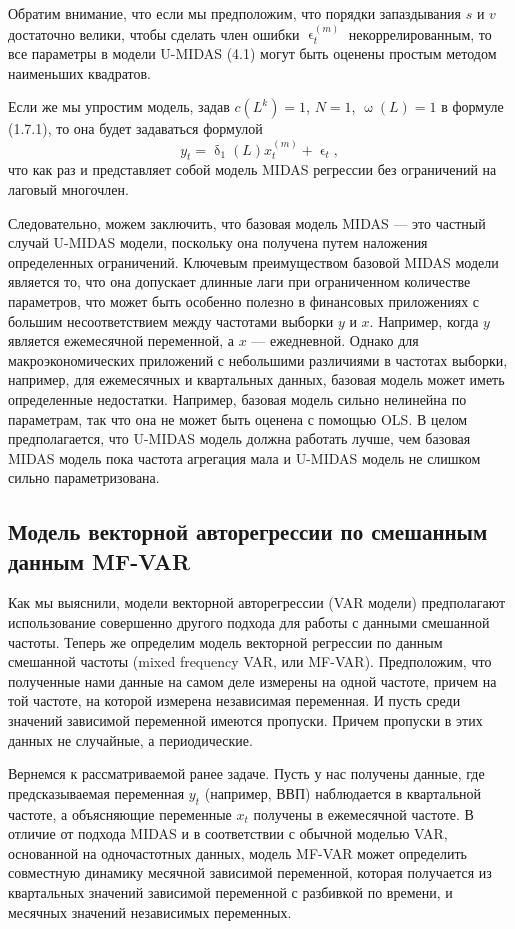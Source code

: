 \documentclass[a4paper, 12pt]{extarticle}
\numberwithin{equation}{subsection}
\renewcommand{\delta}{\updelta}
\renewcommand{\omega}{\upomega}
\renewcommand{\epsilon}{\upvarepsilon}
\begin{document}
	Обратим внимание, что если мы предположим, что порядки запаздывания $s$ и $v$ достаточно велики, чтобы сделать член
	ошибки $\epsilon_t^{(m)}$ некоррелированным, то все параметры в модели U-MIDAS (4.1) могут быть
	оценены простым методом наименьших квадратов.
	
	Если же мы упростим модель, задав $c(L^k) = 1$, $N = 1$, $\omega(L) = 1$ в формуле (1.7.1), то она будет задаваться формулой 
	\begin{equation}
		y_t = \delta_1(L)x_t^{(m)} + \epsilon_t,
	\end{equation}
	что как раз и представляет собой модель MIDAS регрессии без ограничений на лаговый многочлен.
	
	Следовательно, можем заключить, что базовая модель MIDAS  --- это частный случай U-MIDAS модели, поскольку она получена путем наложения определенных ограничений. Ключевым преимуществом базовой MIDAS модели является то, что она допускает длинные лаги при ограниченном количестве параметров, что может быть особенно полезно в финансовых приложениях с большим несоответствием между частотами выборки $y$ и $x$. Например, когда $y$ является ежемесячной переменной, а $x$ --- ежедневной. Однако для макроэкономических приложений с небольшими различиями в частотах выборки, например, для ежемесячных и квартальных данных, базовая модель может иметь определенные недостатки. Например, базовая модель сильно нелинейна по параметрам, так что она не может быть оценена с помощью OLS. В целом предполагается, что U-MIDAS модель должна работать лучше, чем базовая MIDAS модель пока частота агрегация мала и U-MIDAS модель не слишком сильно параметризована.
	\subsection{Модель векторной авторегрессии по смешанным данным MF-VAR}
	Как мы выяснили, модели векторной авторегрессии (VAR модели) предполагают использование совершенно другого подхода для работы с данными смешанной частоты. Теперь же определим модель векторной регрессии по данным смешанной частоты (mixed frequency VAR, или MF-VAR). Предположим, что полученные нами данные на самом деле измерены на одной частоте, причем на той частоте, на которой измерена независимая переменная. И пусть среди значений зависимой переменной имеются пропуски. Причем пропуски в этих данных не случайные, а периодические.
	
	Вернемся к рассматриваемой ранее задаче. Пусть у нас получены данные, где предсказываемая переменная $y_t$ (например, ВВП) наблюдается в квартальной частоте, а объясняющие переменные $x_t$ получены в ежемесячной частоте. В отличие от подхода MIDAS и в соответствии с обычной моделью VAR, основанной на
	одночастотных данных, модель MF-VAR может определить совместную динамику месячной зависимой переменной,
	которая получается из квартальных значений зависимой переменной с разбивкой по времени, и месячных значений независимых переменных.
	
\end{document}
